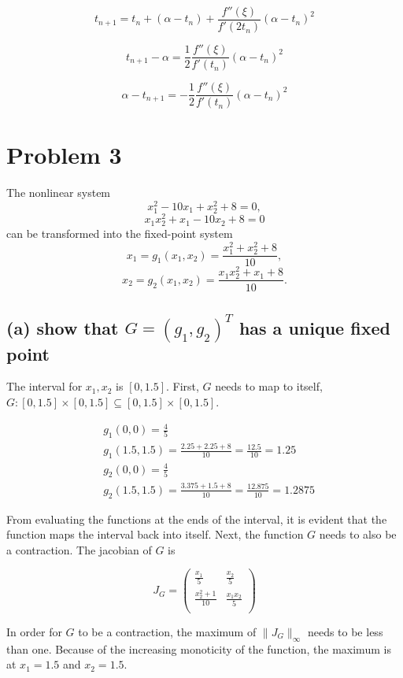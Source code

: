 \documentclass[11pt]{article}
\begin{document}
\[
  t_{n+1}=t_n + (\alpha - t_n) + \frac{f''(\xi)}{f'(2t_n)}(\alpha - t_n)^2
\]

\[
  t_{n+1} - \alpha = \frac{1}{2}\frac{f''(\xi)}{f'(t_n)}(\alpha - t_n)^2  
\]

\[
  \alpha - t_{n+1} = -\frac{1}{2}\frac{f''(\xi)}{f'(t_n)}(\alpha-t_n)^2
\]

\vspace{6in}

\newpage

\section*{Problem 3}

The nonlinear system
\[
x_1^2-10x_1+x_2^2+8=0,
\]
\[
x_1x_2^2+x_1-10x_2+8=0
\]
can be transformed into the fixed-point system
\[
x_1=g_1(x_1,x_2)=\frac{x_1^2+x_2^2+8}{10},
\]
\[
x_2=g_2(x_1,x_2)=\frac{x_1x_2^2+x_1+8}{10}.
\]

\subsection*{(a) show that $G=(g_1,g_2)^T$ has a unique fixed point}

The interval for $x_1,x_2$ is $[0,1.5]$. First, $G$ needs to map to itself, 
$G:[0,1.5] \times [0,1.5] \subseteq [0,1.5] \times [0,1.5]$.

\[
\begin{aligned}
  &g_1(0, 0) =  \frac{4}{5}\\
  &g_1(1.5, 1.5) = \frac{2.25 + 2.25 + 8}{10} = \frac{12.5}{10} = 1.25 \\
  &g_2(0, 0) = \frac{4}{5}\\
  &g_2(1.5, 1.5) = \frac{3.375 + 1.5 + 8}{10} = \frac{12.875}{10} = 1.2875
\end{aligned}
\]

\noindent From evaluating the functions at the ends of the interval, it is evident that
the function maps the interval back into itself. Next, the function $G$ needs to also be a 
contraction. The jacobian of $G$ is 

\[J_G = 
\begin{pmatrix}
    \frac{x_1}{5} & \frac{x_2}{5} \\
    \frac{x_2^2+1}{10} & \frac{x_1x_2}{5} \\
\end{pmatrix}
\]

\noindent In order for $G$ to be a contraction, the maximum of $\|J_G\|_{\infty}$ needs to be
less than one. Because of the increasing monoticity of the function, the maximum is at $x_1=1.5$ and $x_2=1.5$.
\end{document}
